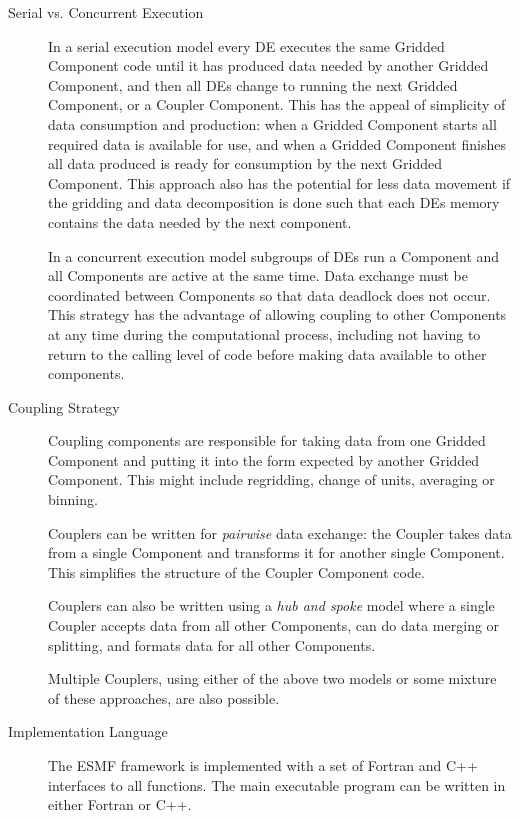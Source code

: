 \begin{description}

\item[Serial vs. Concurrent Execution]

In a serial execution model every DE executes the same Gridded 
Component code until it has produced data needed by another 
Gridded Component, and then all DEs change to running the next 
Gridded Component, or a Coupler Component.  This has the appeal of 
simplicity of data consumption and production: when a Gridded 
Component starts all required data is available for use, and when 
a Gridded Component finishes all data produced is ready for consumption 
by the next Gridded Component.  This approach also has
the potential for less data movement if the gridding and
data decomposition is done such that each DEs memory contains
the data needed by the next component.

In a concurrent execution model subgroups of DEs run
a Component and all Components are active at the same time.  
Data exchange must be coordinated between Components so that
data deadlock does not occur.  This strategy has the advantage
of allowing coupling to other Components at any time during
the computational process, including not having to return to
the calling level of code before making data available to 
other components.

\item[Coupling Strategy]

Coupling components are responsible for taking data from one
Gridded Component and putting it into the form expected by another 
Gridded Component.
This might include regridding, change of units, averaging or binning.

Couplers can be written for {\it pairwise} data exchange: the Coupler takes
data from a single Component and transforms it for another single Component.
This simplifies the structure of the Coupler Component code.

Couplers can also be written using a {\it hub and spoke} model where a
single Coupler accepts data from all other Components, can do data
merging or splitting, and formats data for all other Components.

Multiple Couplers, using either of the above two models or some mixture of
these approaches, are also possible.

\item[Implementation Language]

The ESMF framework is implemented with a set of Fortran and C++ interfaces
to all functions.  The main executable program can be written in either
Fortran or C++.


\end{description}
